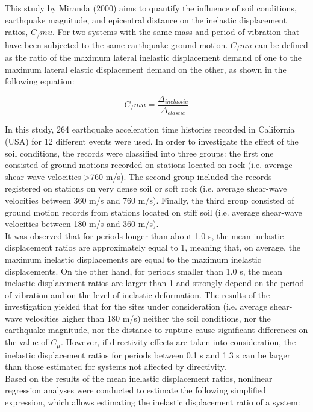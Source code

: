 This study by Miranda (2000) aims to quantify the influence of soil conditions, earthquake magnitude, and epicentral distance on the inelastic displacement ratios, $C_/mu$. For two systems with the same mass and period of vibration that have been subjected to the same earthquake ground motion. $C_/mu$ can be defined as the ratio of the maximum lateral inelastic displacement demand of one to the maximum lateral elastic displacement demand on the other, as shown in the following equation:

\begin{equation}
C_/mu = \frac{\Delta_{inelastic}}{\Delta_{elastic}}
\end{equation} 

In this study, 264 earthquake acceleration time histories recorded in California (USA) for 12 different events were used. In order to investigate the effect of the soil conditions, the records were classified into three groups: the first one consisted of ground motions recorded on stations located on rock (i.e. average shear-wave velocities >760 m/s). The second group included the records registered on stations on very dense soil or soft rock (i.e. average shear-wave velocities between 360 m/s and 760 m/s). Finally, the third group consisted of ground motion records from stations located on stiff soil (i.e. average shear-wave velocities between 180 m/s and 360 m/s).\\

It was observed that for periods longer than about 1.0 s, the mean inelastic displacement ratios are approximately equal to 1, meaning that, on average, the maximum inelastic displacements are equal to the maximum inelastic displacements. On the other hand, for periods smaller than 1.0 s, the mean inelastic displacement ratios are larger than 1 and strongly depend on the period of vibration and on the level of inelastic deformation.
The results of the investigation yielded that for the sites under consideration (i.e. average shear-wave velocities higher than 180 m/s) neither the soil conditions, nor the earthquake magnitude, nor the distance to rupture cause significant differences on the value of $C_\mu$. However, if directivity effects are taken into consideration, the inelastic displacement ratios for periods between 0.1 s and 1.3 s can be larger than those estimated for systems not affected by directivity.\\

Based on the results of the mean inelastic displacement ratios, nonlinear regression analyses were conducted to estimate the following simplified expression, which allows estimating the inelastic displacement ratio of a system:
	
